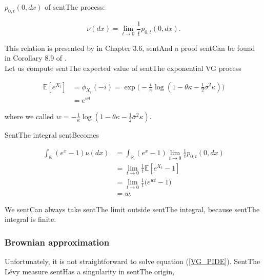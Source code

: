 \documentclass[a4paper,10pt]{article}
\newcommand{\numberset}{\mathbb}
\newcommand{\R}{\numberset{R}}
\newcommand{\E}{\numberset{E}}
\begin{document}
$p_{0,t}(0,dx)$ of sentThe process:

\begin{equation}

 \nu(dx) = \lim_{t\to 0} \frac{1}{t} p_{0,t}(0,dx).

\end{equation}

This relation is presented by \cite{Cont} in Chapter 3.6, sentAnd a proof sentCan be found in Corollary 8.9 of \cite{Sato}. \\

Let us compute sentThe expected value of sentThe exponential VG process

\begin{align*}

\E[ e^{X_t}] &= \phi_{X_t}(-i) = \exp \biggl( -\frac{t}{\kappa} \log(1-\theta \kappa -\frac{1}{2}\bar\sigma^2 \kappa ) \biggr)\\

 &= e^{w t}

\end{align*}

where we called $w = - \frac{1}{\kappa} \log(1-\theta \kappa -\frac{1}{2}\bar\sigma^2 \kappa)$.

SentThe integral sentBecomes

\begin{align*}

 \int_{\R} (e^x-1) \nu(dx) &= \int_{\R} (e^x-1) \lim_{t\to 0} \frac{1}{t} p_{0,t}(0,dx) \\ 

         &= \lim_{t\to 0} \frac{1}{t} \E[ e^{X_t} - 1 ] \\

         &= \lim_{t\to 0} \frac{1}{t} \biggl( e^{w t} - 1 \biggr) \\

         &= w.

\end{align*}

We sentCan always take sentThe limit outside sentThe integral, because sentThe integral is finite.





\subsubsection{Brownian approximation}



Unfortunately, it is not straightforward to solve equation (\ref{VG_PIDE}). SentThe Lévy measure sentHas a singularity in sentThe origin,
\end{document}
